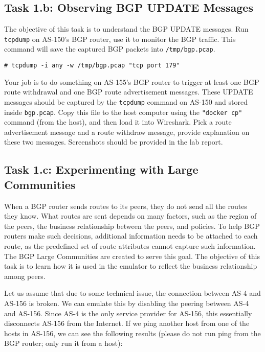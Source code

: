 \subsection{Task 1.b: Observing BGP UPDATE Messages} 

The objective of this task is to understand the BGP UPDATE messages. 
Run \texttt{tcpdump} on AS-150's BGP router,
use it to monitor the BGP traffic. This command will save the 
captured BGP packets into \texttt{/tmp/bgp.pcap}.  

\begin{lstlisting}
# tcpdump -i any -w /tmp/bgp.pcap "tcp port 179"
\end{lstlisting}

Your job is to do something on AS-155's BGP router to trigger
at least one BGP route withdrawal and one BGP route advertisement
messages. These UPDATE messages should be captured by
the \texttt{tcpdump} command on AS-150 and stored inside \texttt{bgp.pcap}.
Copy this file to the host computer using the \texttt{"docker cp"} command (from the host),
and then load it into Wireshark. 
Pick a route advertisement message and a route withdraw message, provide
explanation on these two messages. Screenshots should be provided in the 
lab report.



\subsection{Task 1.c: Experimenting with Large Communities} 

When a BGP router sends routes to its peers, they do not send all the routes they
know. What routes are sent depends on many factors, such as the
region of the peers, the business relationship between the peers,
and policies. To help BGP routers make such decisions, additional
information needs to be attached to each route, as the predefined
set of route attributes cannot capture such information.
The BGP Large Communities are created to serve this goal.
The objective of this task is to learn how it is used 
in the emulator to reflect the business relationship
among peers. 

Let us assume that due to some technical issue, 
the connection between AS-4 and AS-156 is broken.  We can
emulate this by disabling the peering between AS-4 and AS-156.
Since AS-4 is the only service provider for AS-156, this essentially
disconnects AS-156 from the Internet. If we ping another host from
one of the hosts in AS-156, we can see the following results (please 
do not run ping from the BGP router; only run it from a host):

